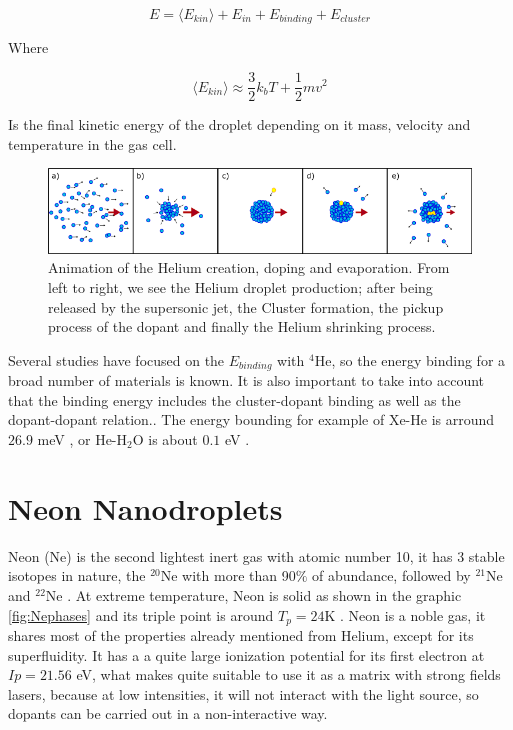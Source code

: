 \begin{equation}
E=\langle E_{kin}\rangle + E_{in} + E_{binding} + E_{cluster}
\end{equation}

Where

\begin{equation}
\langle E_{kin}\rangle \approx \dfrac{3}{2}k_{b}T + \dfrac{1}{2} m v^{2}
\end{equation}

Is the final kinetic energy of the droplet depending on it mass, velocity and temperature in the gas cell.


\begin{figure}[h!]

\centering
\includegraphics[width=14cm]{../Images/He_evaporation (2).png}
\caption[Helium creation, doping and evaporation sketch]{Animation of the Helium creation, doping and evaporation. From left to right, we see the Helium droplet production; after being released by the supersonic jet, the Cluster formation, the pickup process of the dopant and finally the Helium shrinking process.}
\label{fig:shrink}
\end{figure}

Several studies have focused on the $E_{binding}$ with $^{4}$He,  so the energy binding  for a broad number of materials is known. It is also important to take into account that the binding energy includes the cluster-dopant binding as well as the dopant-dopant relation.\cite{toennies_spectroscopy_1998}. The energy bounding for example of Xe-He is arround $26.9 $ meV \cite{lewerenz_successive_1995}, or He-H$_{2}$O is about $0.1$ eV \cite{lewis_Helium_2014}.

\section{Neon Nanodroplets}

Neon (Ne) is the second lightest inert gas with atomic number 10, it has 3 stable isotopes in nature, the $^{20}$Ne with more than 90$\%$ of abundance, followed by $^{21}$Ne and  $^{22}$Ne \cite{meija_atomic_2016}. At extreme temperature, Neon is solid as shown in the graphic \ref{fig:Nephases} and its triple point is around $T_{p}=24$K \cite{young_phase_nodate}. Neon is a noble gas, it shares most of the properties already mentioned from Helium, except for its superfluidity.  It has a a quite large ionization potential for its first electron at $Ip=21.56$ eV, what makes quite suitable to use it as a matrix with strong fields lasers, because at low intensities, it will not interact with the light source, so dopants can be carried out in a non-interactive way.
  

